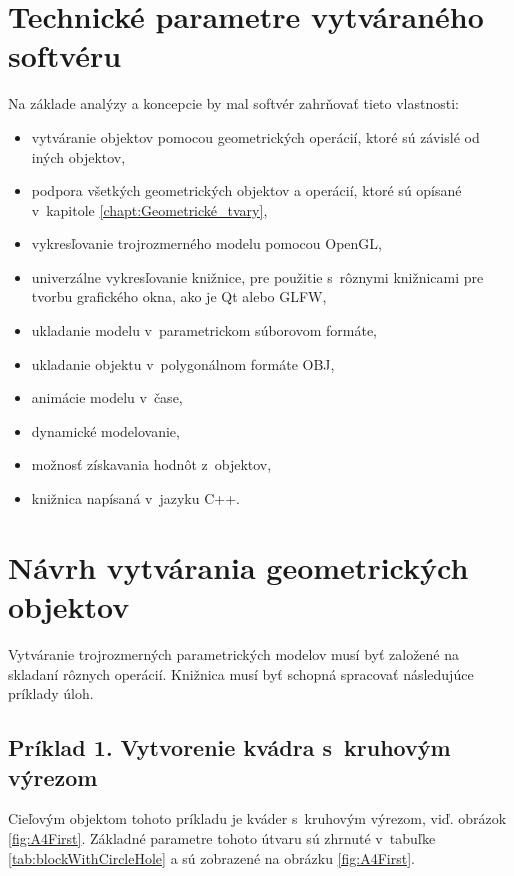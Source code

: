 \section{Technické parametre vytváraného softvéru}
Na základe analýzy a koncepcie  by mal softvér zahrňovať tieto vlastnosti:
\begin{itemize}
\item vytváranie objektov pomocou geometrických operácií, ktoré sú závislé od iných objektov,
\item podpora všetkých geometrických objektov a operácií, ktoré sú opísané v~kapitole \ref{chapt:Geometrické_tvary},
\item vykresľovanie trojrozmerného modelu pomocou OpenGL,
\item univerzálne vykresľovanie knižnice, pre použitie s~rôznymi knižnicami pre tvorbu grafického okna, ako je Qt alebo GLFW,
\item ukladanie modelu v~parametrickom súborovom formáte,
\item ukladanie objektu v~polygonálnom formáte  OBJ,
\item animácie modelu v~čase,
\item dynamické modelovanie,
\item možnosť získavania hodnôt z~objektov,
\item knižnica napísaná v~jazyku C++.
\end{itemize}


\section{Návrh vytvárania geometrických objektov} \label{sec:navrhOperacii}
Vytváranie trojrozmerných parametrických modelov musí byť založené na skladaní rôznych operácií. 
Knižnica musí byť schopná spracovať následujúce príklady úloh.

\subsection*{Príklad 1. Vytvorenie kvádra s~kruhovým výrezom}
Cieľovým objektom tohoto príkladu je kváder s~kruhovým výrezom, viď. obrázok \ref{fig:A4First}. Základné parametre tohoto útvaru sú zhrnuté v~tabuľke \ref{tab:blockWithCircleHole}  a sú zobrazené na obrázku \ref{fig:A4First}.

